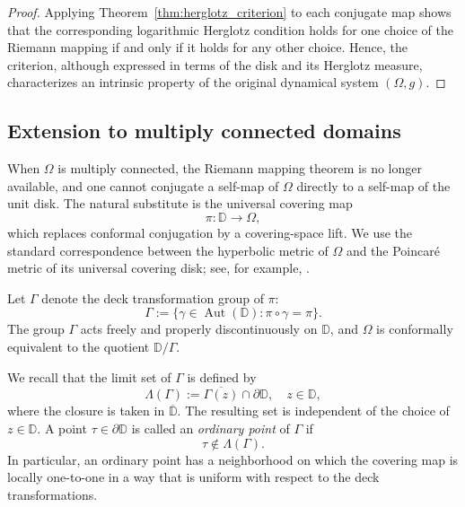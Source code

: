 \documentclass[10pt,a4paper]{amsart}
\numberwithin{equation}{section}
\begin{document}
\begin{proof}
Applying Theorem~\ref{thm:herglotz_criterion} to each conjugate map
shows that the corresponding logarithmic Herglotz condition holds
for one choice of the Riemann mapping if and only if it holds for any
other choice. Hence, the criterion, although expressed in terms of the
disk and its Herglotz measure, characterizes an intrinsic property of
the original dynamical system $(\Omega,g)$.
\end{proof}


\subsection{Extension to multiply connected domains}
\label{subsec:multiply_connected}

When $\Omega$ is multiply connected, the Riemann mapping theorem is no
longer available, and one cannot conjugate a self-map of $\Omega$ directly
to a self-map of the unit disk. The natural substitute is the universal
covering map
\begin{equation*}
\pi:\mathbb D\to\Omega,
\end{equation*}
which replaces conformal conjugation by a covering-space lift. We use the
standard correspondence between the hyperbolic metric of $\Omega$ and the
Poincar\'e metric of its universal covering disk; see, for example,
\cite[Sections 1.6, 1.7, and 3.3]{Abate19}.

Let $\Gamma$ denote the deck transformation group of $\pi$:
\begin{equation*}
\label{eq:deck_group}
\Gamma
:=
\{\gamma\in\operatorname{Aut}(\mathbb D):
\pi\circ\gamma=\pi\}.
\end{equation*}
The group $\Gamma$ acts freely and properly discontinuously on $\mathbb D$,
and $\Omega$ is conformally equivalent to the quotient
$\mathbb D/\Gamma$.

We recall that the limit set of $\Gamma$ is defined by
\begin{equation*}
\label{eq:limit_set}
\Lambda(\Gamma)
:=
\overline{\Gamma(z)}\cap\partial\mathbb D,
\quad z\in\mathbb D,
\end{equation*}
where the closure is taken in $\overline{\mathbb D}$. The resulting set is
independent of the choice of $z\in\mathbb D$. A point
$\tau\in\partial\mathbb D$ is called an \emph{ordinary point} of $\Gamma$
if
\begin{equation*}
\tau\notin\Lambda(\Gamma).
\end{equation*}
In particular, an ordinary point has a neighborhood on which the covering
map is locally one-to-one in a way that is uniform with respect to the
deck transformations.
\end{document}
